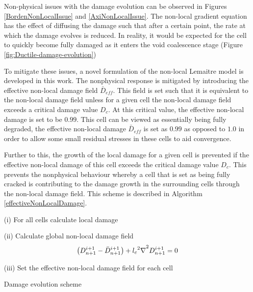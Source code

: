 \documentclass[sn-mathphys,Numbered,draft]{sn-jnl}%
\begin{document}
Non-physical issues with the damage evolution can be observed in Figures \ref{BordenNonLocalIssue} and \ref{AxiNonLocalIssue}. The non-local gradient equation has the effect of diffusing the damage such that after a certain point, the rate at which the damage evolves is reduced. In reality, it would be expected for the cell to quickly become fully damaged as it enters the void coalescence stage (Figure \ref{fig:Ductile-damage-evolution}) 

To mitigate these issues, a novel formulation of the non-local Lemaitre model is developed in this work. The nonphysical response is mitigated by introducing the effective non-local damage field $\bar{D}_{eff}$. This field is set such that it is equivalent to the non-local damage field unless for a given cell the non-local damage field exceeds a critical damage value $D_c$. At this critical value, the effective non-local damage is set to be $0.99$. This cell can be viewed as essentially being fully degraded, the effective non-local damage $\bar{D}_{eff}$ is set as $0.99$ as opposed to $1.0$ in order to allow some small residual stresses in these cells to aid convergence.

Further to this, the growth of the local damage for a given cell is prevented if the effective non-local damage of this cell exceeds the critical damage value $D_c$. This prevents the nonphysical behaviour whereby a cell that is set as being fully cracked is contributing to the damage growth in the surrounding cells through the non-local damage field. This scheme is described in Algorithm \ref{effectiveNonLocalDamage}.

\begin{algorithm}[H]
\label{effectiveNonLocalDamage}
\SetAlgoLined
(i) For all cells calculate local damage  \\


(ii) Calculate global non-local damage field
\begin{equation}
	\left(D^{i+1}_{n+1}-\bar{D}^{i+1}_{n+1}\right)+{{l_c}^2\mathrm{\nabla}}^2D^{i+1}_{n+1}=0 \notag	
\end{equation}

(iii) Set the effective non-local damage field for each cell \\
\caption{Damage evolution scheme}
\end{algorithm}
\end{document}
